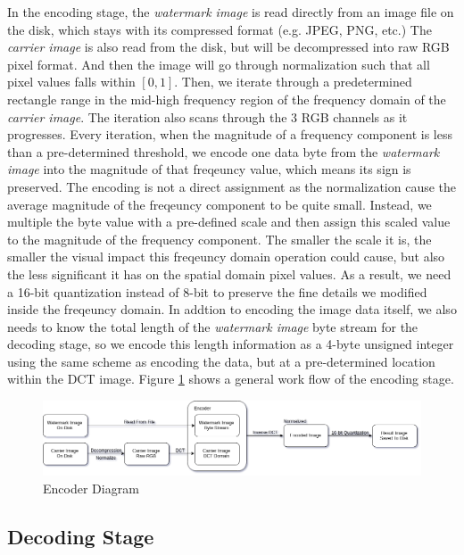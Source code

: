 \documentclass{article}
\begin{document}
In the encoding stage, the \textit{watermark image} is read directly from an
image file on the disk, which stays with its compressed format (e.g. JPEG, PNG, etc.)
The \textit{carrier image} is also read from the disk, but will be decompressed into raw
RGB pixel format. And then the image will go through normalization such that all pixel
values falls within $[0,1]$. Then, we iterate through a predetermined rectangle
range in the mid-high frequency region of the frequency domain of the
\textit{carrier image}. The iteration also scans through the 3 RGB channels as it
progresses. Every iteration, when the magnitude of a frequency component is less
than a pre-determined threshold, we encode one data byte from the
\textit{watermark image} into the magnitude of that freqeuncy value, which means
its sign is preserved. The encoding is not a direct assignment as the normalization
cause the average magnitude of the freqeuncy component to be quite small. Instead,
we multiple the byte value with a pre-defined scale and then assign this scaled value
to the magnitude of the frequency component. The smaller the scale it is, the smaller
the visual impact this freqeuncy domain operation could cause, but also the less
significant it has on the spatial domain pixel values. As a result, we need a
16-bit quantization instead of 8-bit to preserve the fine details we modified inside
the freqeuncy domain. In addtion to encoding the image data
itself, we also needs to know the total length of the \textit{watermark image} byte
stream for the decoding stage, so we encode this length information as a 4-byte unsigned
integer using the same scheme as encoding the data, but at a pre-determined location
within the DCT image. Figure \ref{fig:encoder} shows a general work flow of the
encoding stage.

\begin{figure}[h]
    \centering
    \includegraphics[width=\textwidth]{encoder}
    \caption{Encoder Diagram}
    \label{fig:encoder}
\end{figure}

\subsection{Decoding Stage}
\end{document}
